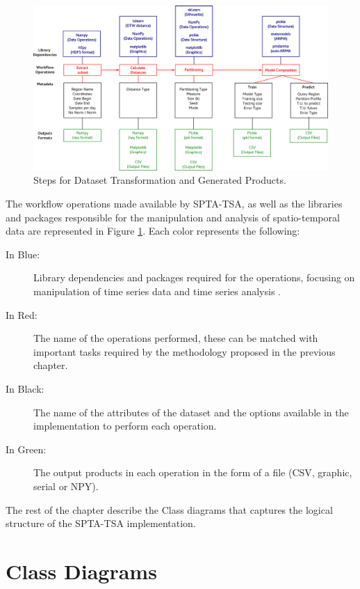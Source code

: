 \begin{figure}[tp]
	\centering
	\includegraphics[scale=0.25, angle=90]{../Figures/workflow_data_operations}
	\caption{Steps for Dataset Transformation and Generated Products.}	
	\label{Fig:Steps-Data-Transformation}	 		
\end{figure}

The workflow operations made available by SPTA-TSA, as well as the libraries and packages responsible for the manipulation and analysis of spatio-temporal data are represented in Figure \ref{Fig:Steps-Data-Transformation}. Each color represents the following:

\begin{description}
    \item[In Blue:] Library dependencies and packages required for the operations, focusing on manipulation of time series data and time series analysis .
    \item[In Red:] The name of the operations performed, these can be matched with important tasks required by the methodology proposed in the previous chapter.
    \item[In Black:] The name of the attributes of the dataset and the options available in the implementation to perform each operation.
    \item[In Green:] The output products in each operation in the form of a file (CSV, graphic, serial or NPY).
\end{description}

The rest of the chapter describe the Class diagrams that captures the logical structure of the SPTA-TSA implementation.

\section{Class Diagrams}
\label{Sec:SPT-TSAClassDiagrams}

